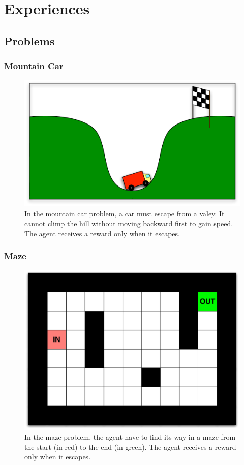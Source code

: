 \section{Experiences}
\subsection{Problems}
\subsubsection{Mountain Car}
\begin{figure}
\center
\includegraphics[width=0.75\linewidth]{MC_problem.pdf}
\caption{In the mountain car problem, a car must escape from a valey. It cannot climp the hill without moving backward first to gain speed. The agent receives a reward only when it escapes.}\label{fig:MC:problem}
\end{figure}

\subsubsection{Maze}
\begin{figure}
\center
\includegraphics[width=0.75\linewidth]{MZ_problem.pdf}
\caption{In the maze problem, the agent have to find its way in a maze from the start (in red) to the end (in green). The agent receives a reward only when it escapes.}\label{fig:MC:problem}
\end{figure}

